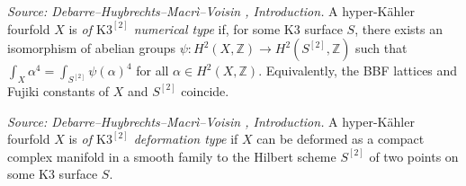 \begin{definition}
  \label{def:k3-squared-numerical-type}
  \textit{Source: Debarre--Huybrechts--Macr\`i--Voisin \cite{MR4654610}, Introduction.}
  A hyper-K\"ahler fourfold \(X\) is \emph{of \(\mathrm{K3}^{[2]}\) numerical type} if,
  for some K3 surface \(S\), there exists an isomorphism of abelian groups
  \(\psi \colon H^2(X, \mathbb{Z}) \to H^2(S^{[2]}, \mathbb{Z})\) such that
  \(\int_X \alpha^4 = \int_{S^{[2]}} \psi(\alpha)^4\) for all
  \(\alpha \in H^2(X, \mathbb{Z})\).  Equivalently, the BBF lattices and Fujiki constants
  of \(X\) and \(S^{[2]}\) coincide.
\end{definition}

\begin{definition}
  \label{def:k3-squared-deformation-type}
  \textit{Source: Debarre--Huybrechts--Macr\`i--Voisin \cite{MR4654610}, Introduction.}
  A hyper-K\"ahler fourfold \(X\) is \emph{of \(\mathrm{K3}^{[2]}\) deformation type} if
  \(X\) can be deformed as a compact complex manifold in a smooth family to the Hilbert
  scheme \(S^{[2]}\) of two points on some K3 surface \(S\).
\end{definition}

